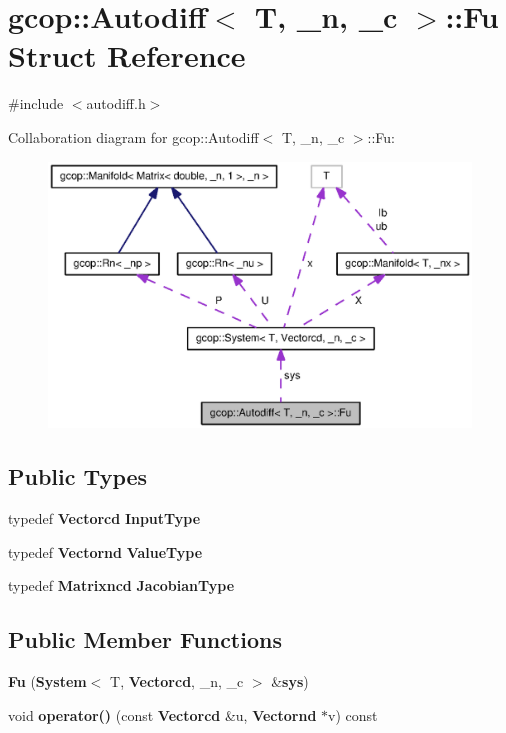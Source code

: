 \section{gcop\-:\-:\-Autodiff$<$ \-T, \-\_\-n, \-\_\-c $>$\-:\-:\-Fu \-Struct \-Reference}
\label{structgcop_1_1Autodiff_1_1Fu}


{\ttfamily \#include $<$autodiff.\-h$>$}



\-Collaboration diagram for gcop\-:\-:\-Autodiff$<$ \-T, \-\_\-n, \-\_\-c $>$\-:\-:\-Fu\-:\nopagebreak
\begin{figure}[H]
\begin{center}
\leavevmode
\includegraphics[width=350pt]{structgcop_1_1Autodiff_1_1Fu__coll__graph}
\end{center}
\end{figure}
\subsection*{\-Public \-Types}
\begin{DoxyCompactItemize}
\item 
typedef {\bf \-Vectorcd} {\bf \-Input\-Type}
\item 
typedef {\bf \-Vectornd} {\bf \-Value\-Type}
\item 
typedef {\bf \-Matrixncd} {\bf \-Jacobian\-Type}
\end{DoxyCompactItemize}
\subsection*{\-Public \-Member \-Functions}
\begin{DoxyCompactItemize}
\item 
{\bf \-Fu} ({\bf \-System}$<$ \-T, {\bf \-Vectorcd}, \-\_\-n, \-\_\-c $>$ \&{\bf sys})
\item 
void {\bf operator()} (const {\bf \-Vectorcd} \&u, {\bf \-Vectornd} $\ast$v) const 
\end{DoxyCompactItemize}
